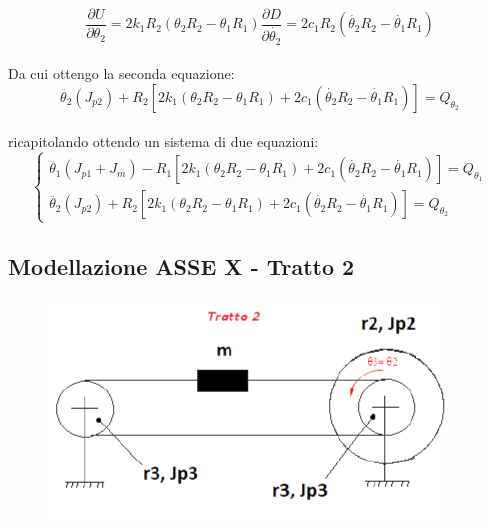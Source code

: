 \documentclass{article}
\begin{document}
\begin{equation*}
\frac{\partial U}{\partial \theta_{2}} = 2k_{1}R_{2}(\theta_{2}R_{2} - \theta_{1}R_{1})
\frac{\partial D}{\partial \dot{\theta_{2}}} = 2c_{1}R_{2}(\dot{\theta_{2}}R_{2} - \dot{\theta_{1}}R_{1})
\end{equation*}
\\
Da cui ottengo la seconda equazione: 
\\
\begin{equation*}
 \ddot{\theta_{2}}(J_{p2}) + R_{2}[2k_{1}(\theta_{2}R_{2}-\theta_{1}R_{1})+ 2c_{1}(\dot{\theta_{2}}R_{2}-\dot{\theta_{1}}R_{1})] = Q_{\theta_2}
\end{equation*}
\\
ricapitolando ottendo un sistema di due equazioni:
\begin{equation*}
\begin{cases}
\ddot{\theta_{1}}(J_{p1}+J_{m}) - R_{1}[2k_{1}(\theta_{2}R_{2}-\theta_{1}R_{1})+ 2c_{1}(\dot{\theta_{2}}R_{2}-\dot{\theta_{1}}R_{1})] = Q_{\theta_1}\\
\ddot{\theta_{2}}(J_{p2}) + R_{2}[2k_{1}(\theta_{2}R_{2}-\theta_{1}R_{1})+ 2c_{1}(\dot{\theta_{2}}R_{2}-\dot{\theta_{1}}R_{1})] = Q_{\theta_2}
\end{cases}
\end{equation*}


\subsection{Modellazione ASSE X - Tratto 2} 
\begin{figure}[H]
\centering
\includegraphics[width=.6\textwidth]{./assex/tratto2.png}
\end{figure}
\end{document}
